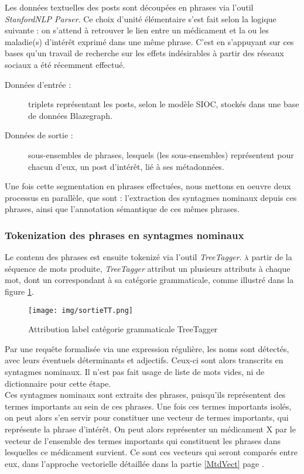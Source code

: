 \documentclass[a4paper, 12pt, openany, oneside, abstract=on]{article} %
\begin{document}
Les données textuelles des posts sont découpées en phrases via l'outil \emph{StanfordNLP Parser}\cite{Manning2014, Klein2018}. Ce choix d'unité élémentaire s'est fait selon la logique suivante : on s'attend à retrouver le lien entre un médicament et la ou les maladie(s) d'intérêt exprimé dans une même phrase. C'est en s'appuyant sur ces bases qu'un travail de recherche sur les effets indésirables à partir des réseaux sociaux a été récemment effectué\cite{Chen2018}.
\begin{description}
    \item[Données d'entrée :] triplets représentant les posts, selon le modèle SIOC, stockés dans une base de données Blazegraph.
    \item[Données de sortie :] sous-ensembles de phrases, lesquels (les sous-ensembles) représentent pour chacun d'eux, un post d'intérêt, lié à ses métadonnées.
\end{description}
Une fois cette segmentation en phrases effectuées, nous mettons en oeuvre deux processus en parallèle, que sont : l'extraction des syntagmes nominaux depuis ces phrases, ainsi que l'annotation sémantique de ces mêmes phrases.

\subsubsection{Tokenization des phrases en syntagmes nominaux}
Le contenu des phrases est ensuite tokenizé via l'outil \emph{TreeTagger}\cite{Schmid}. \textsc{à} partir de la séquence de mots produite, \emph{TreeTagger} attribut un plusieurs attributs à chaque mot, dont un correspondant à sa catégorie grammaticale, comme illustré dans la figure \ref{fig:TreeTagger}.
\begin{figure}[H]
    \centering
    \texttt{[image: img/sortieTT.png]}
    \caption{\label{fig:TreeTagger}Attribution label catégorie grammaticale TreeTagger}
\end{figure}
Par une requête formalisée via une expression régulière, les noms sont détectés, avec leurs éventuels déterminants et adjectifs. Ceux-ci sont alors transcrits en syntagmes nominaux. Il n'est pas fait usage de liste de mots vides, ni de dictionnaire pour cette étape.\\
Ces syntagmes nominaux sont extraits des phrases, puisqu'ils représentent des termes importants au sein de ces phrases\cite{Kathait2017}. Une fois ces termes importants isolés, on peut alors s'en servir pour constituer une vecteur de termes importants, qui représente la phrase d'intérêt. On peut alors représenter un médicament X par le vecteur de l'ensemble des termes importants qui constituent les phrases dans lesquelles ce médicament survient.
Ce sont ces vecteurs qui seront comparés entre eux, dans l'approche vectorielle détaillée dans la partie \ref{MtdVect} page \pageref{MtdVect}.
\end{document}
